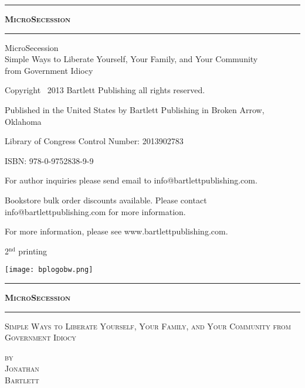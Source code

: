 \begin{titlepage}

\thispagestyle{empty}
\vspace*{\fill}
\begin{center}
\hrule
{\LARGE \textsc{\textbf{MicroSecession}}}
\baselineskip
\hrule
\end{center}
\vspace*{\fill}

\clearpage %

\thispagestyle{empty}
\vspace*{\fill}

{\small
MicroSecession \\ Simple Ways to Liberate Yourself, Your Family, and Your Community \\ from Government Idiocy

Copyright \textcopyright\ 2013 Bartlett Publishing all rights reserved.

Published in the United States by Bartlett Publishing in Broken Arrow, Oklahoma

Library of Congress Control Number: 2013902783

ISBN: 978-0-9752838-9-9

For author inquiries please send email to info@bartlettpublishing.com.  

Bookstore bulk order discounts available.  Please contact info@bartlettpublishing.com for more information.

For more information, please see www.bartlettpublishing.com.

2$^{\textrm{nd}}$ printing
}
\baselineskip

\texttt{[image: bplogobw.png]}


\vspace*{\fill}

\clearpage %

\thispagestyle{empty}
\vspace*{\fill}
\begin{center}
\hrule
{\LARGE \textsc{\textbf{MicroSecession}}}
\baselineskip
\hrule
{}\baselineskip
{\Large \textsc{Simple Ways to Liberate Yourself, Your Family, and Your Community from Government Idiocy}}

\baselineskip

{\LARGE 
	{\textsc{ 
		\hfill by \hspace*{1in} \\ 
		\hfill Jonathan \hspace*{1in} \\ 
		\hfill Bartlett \hspace*{1in} \\
	} }
}


\end{center}
\end{titlepage}
